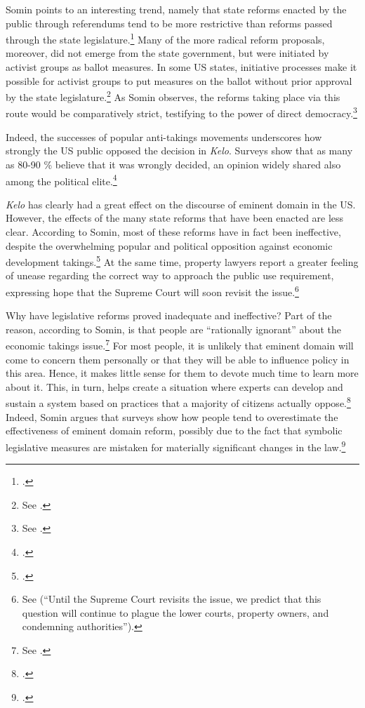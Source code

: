 Somin points to an interesting trend, namely that state reforms enacted by the public through referendums tend to be more restrictive than reforms passed through the state legislature.\footcite[2143]{somin09} Many of the more radical reform proposals, moreover, did not emerge from the state government, but were initiated by activist groups as ballot measures. In some US states, initiative processes make it possible for activist groups to put measures on the ballot without prior approval by the state legislature.\footnote{See \cite[2148]{somin09}.} As Somin observes, the reforms taking place via this route would be comparatively strict, testifying to the power of direct democracy.\footnote{See \cite[2143-2149]{somin09}.}

Indeed, the successes of popular anti-takings movements  underscores how strongly the US public opposed the decision in {\it Kelo}. Surveys show that as many as 80-90 \% believe that it was wrongly decided, an opinion widely shared also among the political elite.\footcite[2109]{somin09} 

{\it Kelo} has clearly had a great effect on the discourse of eminent domain in the US. However, the effects of the many state reforms that have been enacted are less clear. According to Somin, most of these reforms have in fact been ineffective, despite the overwhelming popular and political opposition against economic development takings.\footcite[2170-2171]{somin09} At the same time, property lawyers report a greater feeling of unease regarding the correct way to approach the public use requirement, expressing hope that the Supreme Court will soon revisit the issue.\footnote{See \cite{murakami13} (``Until the Supreme Court revisits the issue, we predict that this question will continue to plague the lower courts, property owners, and condemning authorities'').} 

Why have legislative reforms proved inadequate and ineffective? Part of the reason, according to Somin, is that people are ``rationally ignorant'' about the economic takings issue.\footnote{See \cite[2170]{somin09}.} For most people, it is unlikely that eminent domain will come to concern them personally or that they will be able to influence policy in this area. Hence, it makes little sense for them to devote much time to learn more about it. This, in turn, helps create a situation where experts can develop and sustain a system based on practices that a majority of citizens actually oppose.\footcite[2163-2171]{somin09} Indeed, Somin argues that surveys show how people tend to overestimate the effectiveness of eminent domain reform, possibly due to the fact that symbolic legislative measures are mistaken for materially significant changes in the law.\footcite[2155-2157]{somin09}

